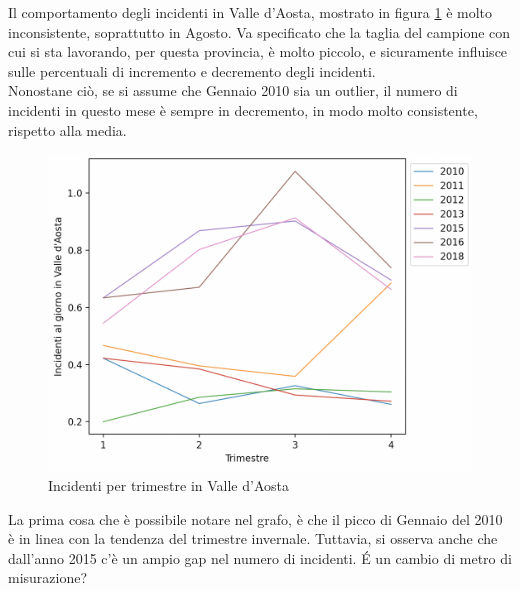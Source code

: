\documentclass[a4paper]{report}
\begin{document}
Il comportamento degli incidenti in Valle d'Aosta, mostrato in figura \ref{fig:aosta-trimestre} 
è molto inconsistente, soprattutto in Agosto.
Va specificato che la taglia del campione con cui si sta lavorando, per questa provincia, 
è molto piccolo, e sicuramente influisce sulle percentuali di incremento e decremento 
degli incidenti.\\
Nonostane ciò, se si assume che Gennaio 2010 sia un outlier, il numero di incidenti in 
questo mese è sempre in decremento, in modo molto consistente, rispetto alla media.

\begin{figure}
    \includegraphics[width=\linewidth]{../src/incidenti/incidenti_senza_coords/mese_incidenti/aosta_timestre.png}
    \caption{Incidenti per trimestre in Valle d'Aosta}
    \label{fig:aosta-trimestre}
\end{figure}

La prima cosa che è possibile notare nel grafo, è che il picco di Gennaio del 2010 è 
in linea con la tendenza del trimestre invernale. 
Tuttavia, si osserva anche che dall'anno 2015 c'è un ampio gap nel numero di 
incidenti. 
\'E un cambio di metro di misurazione? 
\end{document}
